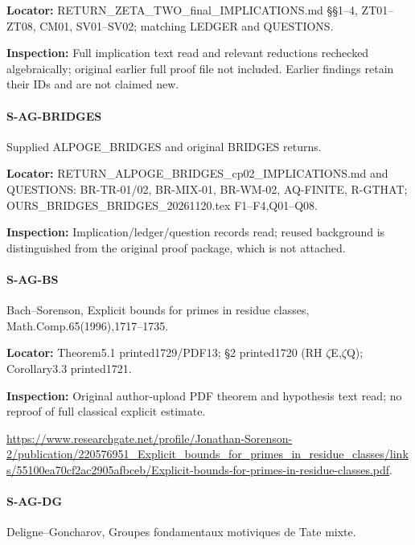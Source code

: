 \documentclass[11pt,a4paper]{article}
\begin{document}
\textbf{Locator:} RETURN\_\allowbreak{}ZETA\_\allowbreak{}TWO\_\allowbreak{}final\_\allowbreak{}IMPLICATIONS.\allowbreak{}md §§1–\allowbreak{}4, ZT01–\allowbreak{}ZT08, CM01, SV01–\allowbreak{}SV02; matching LEDGER and QUESTIONS.

\textbf{Inspection:} Full implication text read and relevant reductions rechecked algebraically; original earlier full proof file not included.\allowbreak{} Earlier findings retain their IDs and are not claimed new.\allowbreak{}


\paragraph{S-AG-BRIDGES} Supplied ALPOGE\_\allowbreak{}BRIDGES and original BRIDGES returns.

\textbf{Locator:} RETURN\_\allowbreak{}ALPOGE\_\allowbreak{}BRIDGES\_\allowbreak{}cp02\_\allowbreak{}IMPLICATIONS.\allowbreak{}md and QUESTIONS:\allowbreak{} BR-TR-01/\allowbreak{}02, BR-MIX-01, BR-WM-02, AQ-FINITE, R-GTHAT; OURS\_\allowbreak{}BRIDGES\_\allowbreak{}BRIDGES\_\allowbreak{}20261120.\allowbreak{}tex F1–\allowbreak{}F4,Q01–\allowbreak{}Q08.

\textbf{Inspection:} Implication/\allowbreak{}ledger/\allowbreak{}question records read; reused background is distinguished from the original proof package, which is not attached.\allowbreak{}


\paragraph{S-AG-BS} Bach–\allowbreak{}Sorenson, Explicit bounds for primes in residue classes, Math.\allowbreak{}Comp.\allowbreak{}65(1996),1717–\allowbreak{}1735.

\textbf{Locator:} Theorem5.\allowbreak{}1 printed1729/\allowbreak{}PDF13; §2 printed1720 (RH \ensuremath{\zeta}E,\ensuremath{\zeta}Q); Corollary3.\allowbreak{}3 printed1721.

\textbf{Inspection:} Original author-upload PDF theorem and hypothesis text read; no reproof of full classical explicit estimate.\allowbreak{}

\url{https://www.researchgate.net/profile/Jonathan-Sorenson-2/publication/220576951_Explicit_bounds_for_primes_in_residue_classes/links/55100ea70cf2ac2905afbceb/Explicit-bounds-for-primes-in-residue-classes.pdf}.

\paragraph{S-AG-DG} Deligne–\allowbreak{}Goncharov, Groupes fondamentaux motiviques de Tate mixte.
\end{document}
